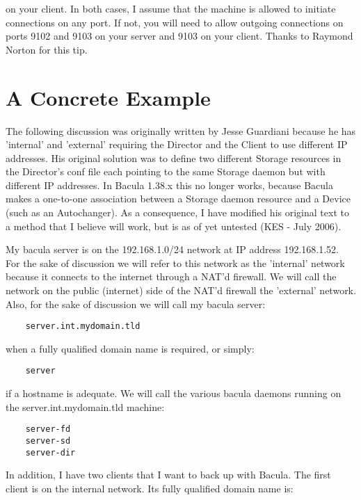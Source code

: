 on your client. In both cases, I assume that the machine is allowed to
initiate connections on any port. If not, you will need to allow outgoing
connections on ports 9102 and 9103 on your server and 9103 on your client.
Thanks to Raymond Norton for this tip. 

\section{A Concrete Example}

The following discussion was originally written by
Jesse Guardiani because he has 'internal' and 'external' requiring the
Director and the Client to use different IP addresses.  His original
solution was to define two different Storage resources in the Director's
conf file each pointing to the same Storage daemon but with different
IP addresses.  In Bacula 1.38.x this no longer works, because Bacula makes
a one-to-one association between a Storage daemon resource and a Device (such
as an Autochanger).  As a consequence, I have modified his original
text to a method that I believe will work, but is as of yet untested
(KES - July 2006).

My bacula server is on the 192.168.1.0/24 network at IP address 192.168.1.52.
For the sake of discussion we will refer to this network as the 'internal'
network because it connects to the internet through a NAT'd firewall. We will
call the network on the public (internet) side of the NAT'd firewall the
'external' network. Also, for the sake of discussion we will call my bacula
server: 

\footnotesize
\begin{verbatim}
    server.int.mydomain.tld
\end{verbatim}
\normalsize

when a fully qualified domain name is required, or simply: 

\footnotesize
\begin{verbatim}
    server
\end{verbatim}
\normalsize

if a hostname is adequate. We will call the various bacula daemons running on
the server.int.mydomain.tld machine: 

\footnotesize
\begin{verbatim}
    server-fd
    server-sd
    server-dir
\end{verbatim}
\normalsize

In addition, I have two clients that I want to back up with Bacula. The first
client is on the internal network. Its fully qualified domain name is: 

